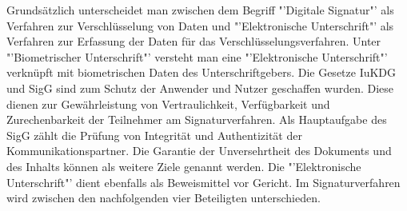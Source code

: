 Grundsätzlich unterscheidet man zwischen dem Begriff "'Digitale Signatur"' als Verfahren zur Verschlüsselung von Daten und "'Elektronische Unterschrift"' als Verfahren zur Erfassung der Daten für das Verschlüsselungsverfahren. Unter "'Biometrischer Unterschrift"' versteht man eine "'Elektronische Unterschrift"' verknüpft mit biometrischen Daten des Unterschriftgebers.
\newline
Die Gesetze IuKDG und SigG sind zum Schutz der Anwender und Nutzer geschaffen wurden. Diese dienen zur Gewährleistung von Vertraulichkeit, Verfügbarkeit und Zurechenbarkeit der Teilnehmer am Signaturverfahren. \cite{standdeswissens1} Als Hauptaufgabe des SigG zählt die Prüfung von Integrität und Authentizität der Kommunikationspartner. Die Garantie der Unversehrtheit des Dokuments und des Inhalts können als weitere Ziele genannt werden. Die "'Elektronische Unterschrift"' dient ebenfalls als Beweismittel vor Gericht. Im Signaturverfahren wird zwischen den nachfolgenden vier Beteiligten unterschieden. \cite{standdeswissens2}